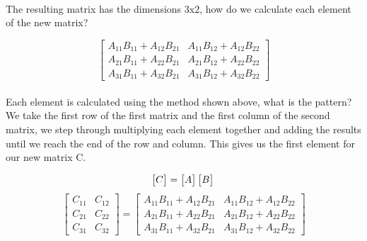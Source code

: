 \documentclass[12pt, letterpaper]{report}
\begin{document}
		\paragraph{} The resulting matrix has the dimensions 3x2, how do we calculate each element of the new matrix?
 
		\begin{equation*}
		\begin{bmatrix}
		A_{11}B_{11}+A_{12}B_{21} & A_{11}B_{12}+A_{12}B_{22}\\
		A_{21}B_{11}+A_{22}B_{21} & A_{21}B_{12}+A_{22}B_{22}\\
		A_{31}B_{11}+A_{32}B_{21} & A_{31}B_{12}+A_{32}B_{22}
		\end{bmatrix}
		\end{equation*}

		\paragraph{} Each element is calculated using the method shown above, what is the pattern? We take the first row of the first matrix and the first column of the second matrix, we step through multiplying each element together and adding the results until we reach the end of the row and column. This gives us the first element for our new matrix C.

		\begin{equation}
		\begin{bmatrix}
		C
		\end{bmatrix}
		=
		\begin{bmatrix}
		A
		\end{bmatrix}
		\begin{bmatrix}
		B
		\end{bmatrix}\\
		\end{equation}
		\begin{equation*}
		\begin{bmatrix}
		C_{11} & C_{12}\\
		C_{21} & C_{22}\\
		C_{31} & C_{32}
		\end{bmatrix}
		=
		\begin{bmatrix}
		A_{11}B_{11}+A_{12}B_{21} & A_{11}B_{12}+A_{12}B_{22}\\
		A_{21}B_{11}+A_{22}B_{21} & A_{21}B_{12}+A_{22}B_{22}\\
		A_{31}B_{11}+A_{32}B_{21} & A_{31}B_{12}+A_{32}B_{22}
		\end{bmatrix}
		\end{equation*}
\end{document}
